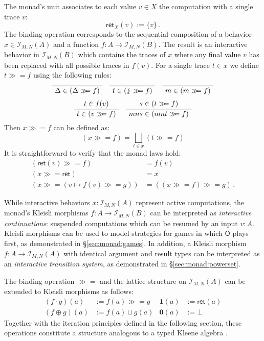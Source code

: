 \documentclass[acmsmall,timestamp,review]{acmart}
\newcommand{\kw}[1]{\ensuremath{ \mathsf{#1} }}
\newcommand{\bind}{\gg\!\!=}
\begin{document}
The monad's unit associates to each value $v \in X$
the computation with a single trace $v$:
\[
    \kw{ret}_X(v) := \{ v \} \,.
\]
The binding operation corresponds to
the sequential composition of
a behavior $x \in \mathcal{I}_{M,N}(A)$ and
a function $f : A \rightarrow \mathcal{I}_{M,N}(B)$.
The result is an interactive behavior in $\mathcal{I}_{M,N}(B)$ which
contains the traces of $x$ where
any final value $v$ has been replaced with
all possible traces in $f(v)$.
For a single trace $t \in x$ we define $t \bind f$
using the following rules:
\begin{gather*}
  \AxiomC{}
  \UnaryInfC{$\Delta \in (\Delta \bind f)$}
  \DisplayProof
  \quad
  \AxiomC{}
  \UnaryInfC{$t \in (\lightning \bind f)$}
  \DisplayProof
  \quad
  \AxiomC{}
  \UnaryInfC{$m \in (m \bind f)$}
  \DisplayProof
  \\[1ex]
  \AxiomC{$t \in f(v)$}
  \UnaryInfC{$t \in (v \bind f)$}
  \DisplayProof
  \quad
  \AxiomC{$s \in (t \bind f)$}
  \UnaryInfC{$mns \in (mnt \bind f)$}
  \DisplayProof
\end{gather*}
Then $x \bind f$ can be defined as:
\[
    (x \bind f) = \bigsqcup_{t \in x} (t \bind f)
\]
It is straightforward to verify that
the monad laws hold:
\begin{align*}
  (\kw{ret}(v) \bind f) &= f(v) \\
  (x \bind \kw{ret}) &= x \\
  (x \bind (v \mapsto f(v) \bind g)) &= ((x \bind f) \bind g) \,.
\end{align*}

While interactive behaviors $x : \mathcal{I}_{M,N}(A)$
represent active computations,
the monad's Kleisli morphisms $f : A \rightarrow \mathcal{I}_{M,N}(B)$
can be interpreted as \emph{interactive continuations}:
suspended computations which can be resumed by an input $v : A$.
Kleisli morphisms can be used to
model strategies for games in which $\kw{O}$ plays first,
as demonstrated in \S\ref{sec:monad:games}.
In addition,
a Kleisli morphism
$f : A \rightarrow \mathcal{I}_{M,N}(A)$
with identical argument and result types
can be interpreted as an \emph{interactive transition system},
as demonstrated in \S\ref{sec:monad:powerset}.

The binding operation $\bind$
and the lattice structure on $\mathcal{I}_{M,N}(A)$
can be extended to Kleisli morphisms as follows:
\begin{align*}
    (f \cdot g)(a) &:= f(a) \bind g &
    \mathbf{1}(a) &:= \kw{ret}(a) \\
    (f \oplus g)(a) &:= f(a) \sqcup g(a) &
    \mathbf{0}(a) &:= \bot
\end{align*}
Together with the iteration principles
defined in the following section,
these operations constitute a structure
analogous to a typed Kleene algebra \cite{tka}.
\end{document}
